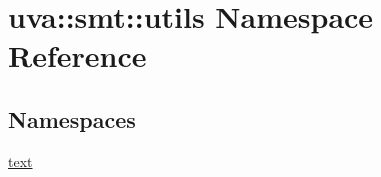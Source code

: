 \hypertarget{namespaceuva_1_1smt_1_1utils}{}\section{uva\+:\+:smt\+:\+:utils Namespace Reference}
\label{namespaceuva_1_1smt_1_1utils}
\subsection*{Namespaces}
\begin{DoxyCompactItemize}
\item 
 \hyperlink{namespaceuva_1_1smt_1_1utils_1_1text}{text}
\end{DoxyCompactItemize}
